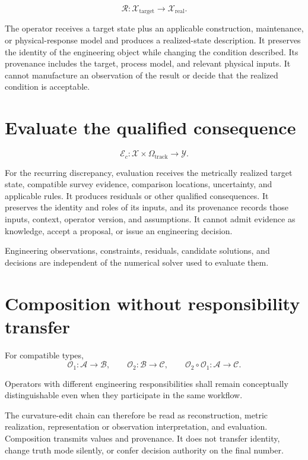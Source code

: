 \begin{definition}
\label{def:realization-operator}
\[
\mathcal R:
\mathcal X_{\mathrm{target}}\rightarrow\mathcal X_{\mathrm{real}}.
\]
\end{definition}

The operator receives a target state plus an applicable construction,
maintenance, or physical-response model and produces a realized-state
description. It preserves the identity of the engineering object while
changing the condition described. Its provenance includes the target,
process model, and relevant physical inputs. It cannot manufacture an
observation of the result or decide that the realized condition is
acceptable.

\section{Evaluate the qualified consequence}

\begin{definition}
\label{def:evaluation-operator}
\[
\mathcal E_c:
\mathcal X\times\Omega_{\mathrm{track}}\rightarrow\mathcal Y.
\]
\end{definition}

For the recurring discrepancy, evaluation receives the metrically
realized target state, compatible survey evidence, comparison locations,
uncertainty, and applicable rules. It produces residuals or other
qualified consequences. It preserves the identity and roles of its
inputs, and its provenance records those inputs, context, operator
version, and assumptions. It cannot admit evidence as knowledge, accept
a proposal, or issue an engineering decision.

\begin{principle}
\label{princ:operators-solver-independence}
Engineering observations, constraints, residuals, candidate solutions,
and decisions are independent of the numerical solver used to evaluate
them.
\end{principle}

\section{Composition without responsibility transfer}

For compatible types,
\[
\mathcal O_1:\mathcal A\rightarrow\mathcal B,
\qquad
\mathcal O_2:\mathcal B\rightarrow\mathcal C,
\qquad
\mathcal O_2\circ\mathcal O_1:
\mathcal A\rightarrow\mathcal C.
\]

\begin{principle}
\label{princ:operator-separation}
Operators with different engineering responsibilities shall remain
conceptually distinguishable even when they participate in the same
workflow.
\end{principle}

The curvature-edit chain can therefore be read as reconstruction,
metric realization, representation or observation interpretation, and
evaluation. Composition transmits values and provenance. It does not
transfer identity, change truth mode silently, or confer decision
authority on the final number.
